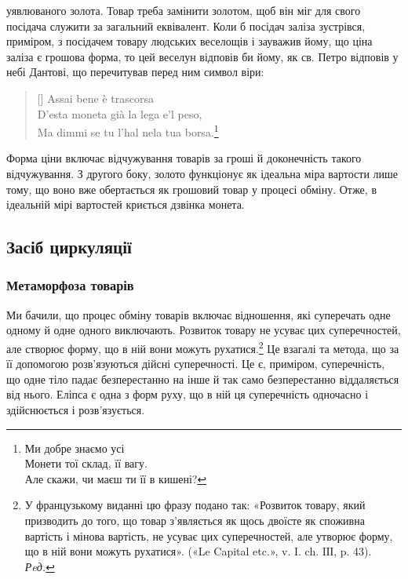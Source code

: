\parcont{}  %
уявлюваного золота. Товар треба замінити золотом, щоб він міг
для свого посідача служити за загальний еквівалент. Коли б
посідач заліза зустрівся, приміром, з посідачем товару людських
веселощів і зауважив йому, що ціна заліза є грошова форма,
то цей веселун відповів би йому, як св. Петро відповів у небі
Дантові, що перечитував перед ним символ віри:
\settowidth{\versewidth}{Is just as much as it will bring».}
\begin{verse}[\versewidth]
Assai bene è trascorsa\\
D’esta moneta già la lega e’l peso,\\
Ma dimmi se tu l’hal nela tua borsa.\footnote*{
\parbox[t]{\textwidth}{
Ми добре знаємо усі\\
Монети тої склад, її вагу.\\
Але скажи, чи маєш ти її в кишені?}
}
\end{verse}

Форма ціни включає відчужування товарів за гроші й доконечність
такого відчужування. З другого боку, золото функціонує
як ідеальна міра вартости лише тому, що воно вже обертається
як грошовий товар у процесі обміну. Отже, в ідеальній
мірі вартостей криється дзвінка монета.

\subsection{Засіб циркуляції}
\subsubsection{Метаморфоза товарів}

Ми бачили, що процес обміну товарів включає відношення,
які суперечать одне одному й одне одного виключають. Розвиток
товару не усуває цих суперечностей, але створює форму, що в
ній вони можуть рухатися.\footnote*{
У французькому виданні цю фразу подано так: «Розвиток товару,
який призводить до того, що товар з’являється як щось двоїсте як споживна
вартість і мінова вартість, не усуває цих суперечностей, але утворює
форму, що в ній вони можуть рухатися». («Le Capital etc.», v. I. ch. IІІ,
p. 43). \emph{Рeд.}
} Це взагалі та метода, що за її допомогою
розв’язуються дійсні суперечності. Це є, приміром, суперечність,
що одне тіло падає безперестанно на інше й так само безперестанно
віддаляється від нього. Еліпса є одна з форм руху,
що в ній ця суперечність одночасно і здійснюється і розв’язується.

